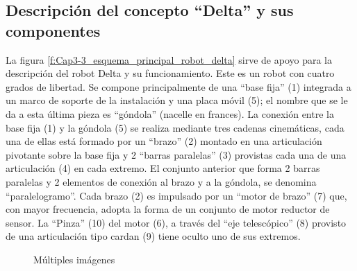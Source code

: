         \newpage
    
    \subsection{Descripción del concepto ``Delta'' y sus componentes}
    La figura \ref{f:Cap3-3_esquema_principal_robot_delta} sirve de apoyo para la descripción del robot Delta y su funcionamiento. Este es un robot con cuatro grados de libertad. Se compone principalmente de una ``base fija'' (1) integrada a un marco de soporte de la instalación y una placa móvil (5); el nombre que se le da a esta última pieza es ``góndola'' (nacelle en frances). La conexión entre la base fija (1) y la góndola (5) se realiza mediante tres cadenas cinemáticas, cada una de ellas está formado por un ``brazo'' (2) montado en una articulación pivotante sobre la base fija y 2 ``barras paralelas'' (3) provistas cada una de una articulación (4) en cada extremo. El conjunto anterior que forma 2 barras paralelas y 2 elementos de conexión al brazo y a la góndola, se denomina ``paralelogramo''. Cada brazo (2) es impulsado por un ``motor de brazo'' (7) que, con mayor frecuencia, adopta la forma de un conjunto de motor reductor de sensor. La ``Pinza'' (10) del motor (6), a través del ``eje telescópico'' (8) provisto de una articulación tipo cardan (9) tiene oculto uno de sus extremos.

    \vspace{-1em}

    \begin{figure}[h]
         \centering
         \caption{Múltiples imágenes}
    \end{figure}

